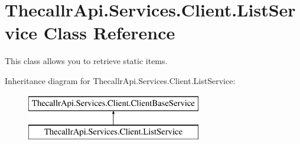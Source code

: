 \hypertarget{class_thecallr_api_1_1_services_1_1_client_1_1_list_service}{\section{Thecallr\+Api.\+Services.\+Client.\+List\+Service Class Reference}
\label{class_thecallr_api_1_1_services_1_1_client_1_1_list_service}
}


This class allows you to retrieve static items.  


Inheritance diagram for Thecallr\+Api.\+Services.\+Client.\+List\+Service\+:\begin{figure}[H]
\begin{center}
\leavevmode
\includegraphics[height=2.000000cm]{class_thecallr_api_1_1_services_1_1_client_1_1_list_service}
\end{center}
\end{figure}
